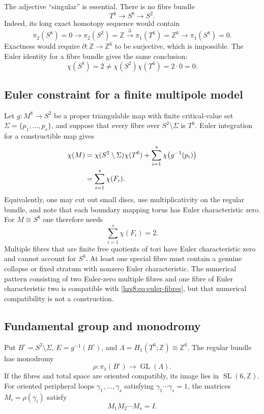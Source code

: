 The adjective ``singular'' is essential.  There is no fibre bundle
\[
 T^6\longrightarrow S^8\longrightarrow S^2.
\]
Indeed, its long exact homotopy sequence would contain
\[
 \pi_2(S^8)=0\longrightarrow\pi_2(S^2)=\mathbb Z
 \xrightarrow{\partial}\pi_1(T^6)=\mathbb Z^6
 \longrightarrow\pi_1(S^8)=0.
\]
Exactness would require $\partial\colon\mathbb Z\to\mathbb Z^6$ to be
surjective, which is impossible.  The Euler identity for a fibre bundle gives
the same conclusion:
\[
 \chi(S^8)=2\neq\chi(S^2)\chi(T^6)=2\cdot0=0.
\]

\subsection{Euler constraint for a finite multipole model}
\label{hrs8:subsec:euler}

Let $g\colon M^8\to S^2$ be a proper triangulable map with finite
critical-value set $\Sigma=\{p_1,\ldots,p_s\}$, and suppose that every fibre
over $S^2\setminus\Sigma$ is $T^6$.  Euler integration for a constructible
map gives
\begin{align}
 \chi(M)
 &=\chi(S^2\setminus\Sigma)\chi(T^6)
   +\sum_{i=1}^s\chi\bigl(g^{-1}(p_i)\bigr)\notag\\
 &=\sum_{i=1}^s\chi(F_i).
 \label{hrs8:eq:euler-integration}
\end{align}
Equivalently, one may cut out small discs, use multiplicativity on the regular
bundle, and note that each boundary mapping torus has Euler characteristic
zero.  For $M\cong S^8$ one therefore needs
\begin{equation}
 \boxed{\sum_{i=1}^s\chi(F_i)=2.}
 \label{hrs8:eq:euler-fibres}
\end{equation}
Multiple fibres that are finite free quotients of tori have Euler
characteristic zero and cannot account for $S^8$.  At least one special fibre
must contain a genuine collapse or fixed stratum with nonzero Euler
characteristic.  The numerical pattern consisting of two Euler-zero multiple
fibres and one fibre of Euler characteristic two is compatible with
\eqref{hrs8:eq:euler-fibres}, but that numerical compatibility is not a
construction.

\subsection{Fundamental group and monodromy}
\label{hrs8:subsec:pi1}

Put $B^\circ=S^2\setminus\Sigma$, $E=g^{-1}(B^\circ)$, and
$\Lambda=H_1(T^6;\mathbb Z)\cong\mathbb Z^6$.  The regular bundle has
monodromy
\[
 \rho\colon\pi_1(B^\circ)\longrightarrow\operatorname{GL}(\Lambda).
\]
If the fibres and total space are oriented compatibly, its image lies in
$\operatorname{SL}(6,\mathbb Z)$.  For oriented peripheral loops
$\gamma_1,\ldots,\gamma_s$ satisfying $\gamma_1\cdots\gamma_s=1$, the
matrices $M_i=\rho(\gamma_i)$ satisfy
\begin{equation}
 M_1M_2\cdots M_s=I.
 \label{hrs8:eq:monodromy-product}
\end{equation}

